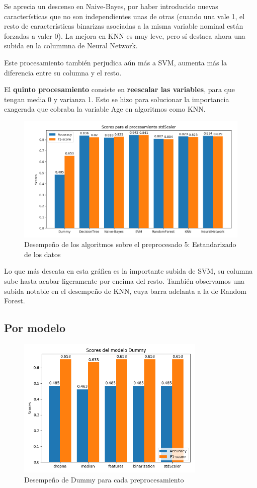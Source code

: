 \documentclass[oneside]{book}
\begin{document}
Se aprecia un descenso en Naive-Bayes, por haber introducido nuevas
características que no son independientes unas de otras (cuando una
vale 1, el resto de características binarizas asociadas a la misma
variable nominal están forzadas a valer 0). La mejora en KNN es muy
leve, pero sí destaca ahora una subida en la colummna de Neural
Network.

Este procesamiento también perjudica aún más a SVM, aumenta más la
diferencia entre su columna y el resto.

El \textbf{quinto procesamiento} consiste en \textbf{reescalar las
  variables}, para que tengan media 0 y varianza 1. Esto se hizo para
solucionar la importancia exagerada que cobraba la variable Age en
algoritmos como KNN.

\begin{figure}[H]
  \centering
  \label{fig:stdScaler}
  \caption{Desempeño de los algoritmos sobre el preprocesado 5: Estandarizado de los datos}
  \includegraphics[width=180mm]{figures/visualizacion/stdScaler}
\end{figure}

Lo que más descata en esta gráfica es la importante subida de SVM, su
columna sube hasta acabar ligeramente por encima del resto. También
observamos una subida notable en el desempeño de KNN, cuya barra
adelanta a la de Random Forest.

\subsection{Por modelo}

\begin{figure}[H]
  \centering
  \label{fig:dummy}
  \caption{Desempeño de Dummy para cada preprocesamiento}
  \includegraphics[width=90mm]{figures/visualizacion/dummy}
\end{figure}
\end{document}
